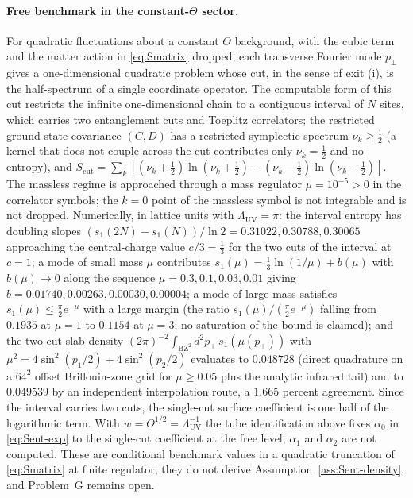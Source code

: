 \paragraph{Free benchmark in the constant-\(\Theta\) sector.}
For quadratic fluctuations about a constant \(\Theta\) background, with the
cubic term and the matter action in \eqref{eq:Smatrix} dropped, each transverse
Fourier mode \(p_\perp\) gives a one-dimensional quadratic problem whose cut,
in the sense of exit (i), is the half-spectrum of a single coordinate operator.
The computable form of this cut restricts the infinite one-dimensional chain to
a contiguous interval of \(N\) sites, which carries two entanglement cuts and
Toeplitz correlators; the restricted ground-state covariance \((C,D)\) has a
restricted symplectic spectrum \(\nu_k\ge\tfrac12\) (a kernel that does not
couple across the cut contributes only \(\nu_k=\tfrac12\) and no entropy), and
\(S_{\mathrm{cut}}=\sum_k[(\nu_k+\tfrac12)\ln(\nu_k+\tfrac12)-(\nu_k-\tfrac12)\ln(\nu_k-\tfrac12)]\).
The massless regime is approached through a mass regulator \(\mu=10^{-5}>0\) in
the correlator symbols; the \(k=0\) point of the massless symbol is not
integrable and is not dropped. Numerically, in lattice units with
\(\Lambda_{\mathrm{UV}}=\pi\): the interval entropy has doubling slopes
\((s_1(2N)-s_1(N))/\ln 2=0.31022,0.30788,0.30065\) approaching the
central-charge value \(c/3=\tfrac13\) for the two cuts of the interval at
\(c=1\); a mode of small mass \(\mu\) contributes
\(s_1(\mu)=\tfrac13\ln(1/\mu)+b(\mu)\) with \(b(\mu)\to0\) along the sequence
\(\mu=0.3,0.1,0.03,0.01\) giving \(b=0.01740,0.00263,0.00030,0.00004\); a mode
of large mass satisfies \(s_1(\mu)\le\tfrac\pi2 e^{-\mu}\) with a large margin
(the ratio \(s_1(\mu)/(\tfrac\pi2 e^{-\mu})\) falling from \(0.1935\) at
\(\mu=1\) to \(0.1154\) at \(\mu=3\); no saturation of the bound is claimed);
and the two-cut slab density
\((2\pi)^{-2}\int_{\mathrm{BZ}^2}d^2p_\perp\,s_1(\mu(p_\perp))\) with
\(\mu^2=4\sin^2(p_1/2)+4\sin^2(p_2/2)\) evaluates to \(0.048728\) (direct
quadrature on a \(64^2\) offset Brillouin-zone grid for \(\mu\ge0.05\) plus the
analytic infrared tail) and to \(0.049539\) by an independent interpolation
route, a \(1.665\) percent agreement. Since the interval carries two cuts, the
single-cut surface coefficient is one half of the logarithmic term. With
\(w=\Theta^{1/2}=\Lambda_{\mathrm{UV}}^{-1}\) the tube identification above
fixes \(\alpha_0\) in \eqref{eq:Sent-exp} to the single-cut coefficient at the
free level; \(\alpha_1\) and \(\alpha_2\) are not computed. These are
conditional benchmark values in a quadratic truncation of \eqref{eq:Smatrix} at
finite regulator; they do not derive Assumption~\ref{ass:Sent-density}, and
Problem~G remains open.

